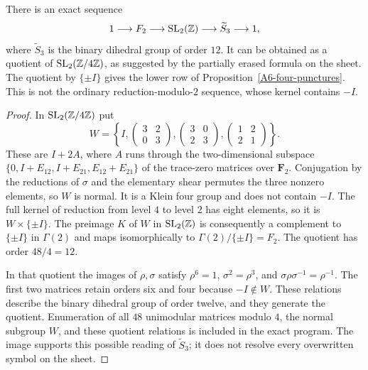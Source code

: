 \begin{proposition}\label{A6-binary-S3}
There is an exact sequence
\[
 1\longrightarrow F_2\longrightarrow\operatorname{SL}_2({\mathbb{Z}})
 \longrightarrow\widetilde{S}_3\longrightarrow1,
\]
where $\widetilde{S}_3$ is the binary dihedral group of order $12$. It can be obtained as a quotient of $\operatorname{SL}_2({\mathbb{Z}}/4{\mathbb{Z}})$, as suggested by the partially erased formula on the sheet. The quotient by $\{\pm I\}$ gives the lower row of Proposition~\ref{A6-four-punctures}. This is not the ordinary reduction-modulo-$2$ sequence, whose kernel contains $-I$.
\end{proposition}
\begin{proof}
In $\operatorname{SL}_2({\mathbb{Z}}/4{\mathbb{Z}})$ put
\[
 W=\left\{
 I,\begin{pmatrix}3&2\\0&3\end{pmatrix},
 \begin{pmatrix}3&0\\2&3\end{pmatrix},
 \begin{pmatrix}1&2\\2&1\end{pmatrix}\right\}.
\]
These are $I+2A$, where $A$ runs through the two-dimensional subspace
$\{0,I+E_{12},I+E_{21},E_{12}+E_{21}\}$ of the trace-zero matrices over $\mathbf F_2$. Conjugation by the reductions of $\sigma$ and the elementary shear permutes the three nonzero elements, so $W$ is normal. It is a Klein four group and does not contain $-I$. The full kernel of reduction from level $4$ to level $2$ has eight elements, so it is $W\times\{\pm I\}$. The preimage $K$ of $W$ in $\operatorname{SL}_2({\mathbb{Z}})$ is consequently a complement to $\{\pm I\}$ in $\Gamma(2)$ and maps isomorphically to $\Gamma(2)/\{\pm I\}=F_2$. The quotient has order $48/4=12$.

In that quotient the images of $\rho,\sigma$ satisfy
$\rho^6=1$, $\sigma^2=\rho^3$, and
$\sigma\rho\sigma^{-1}=\rho^{-1}$. The first two matrices retain orders six and four because $-I\notin W$. These relations describe the binary dihedral group of order twelve, and they generate the quotient. Enumeration of all $48$ unimodular matrices modulo $4$, the normal subgroup $W$, and these quotient relations is included in the exact program. The image supports this possible reading of $\widetilde{S}_3$; it does not resolve every overwritten symbol on the sheet.
\end{proof}

